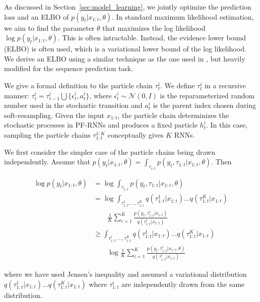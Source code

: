 \documentclass[letterpaper]{article} %
\begin{document}
As discussed in Section~\ref{sec:model_learning}, we jointly optimize the prediction loss and an ELBO of $p(y_t|x_{1:t},\theta)$. In standard maximum likelihood estimation, we aim to find the parameter $\theta$ that maximizes the log likelihood $\log p(y_t|x_{1:t},\theta)$. This is often intractable. Instead, the evidence lower bound (ELBO) is often used, which is a variational lower bound of the log likelihood. We derive an ELBO using a similar technique as the one used in \cite{burda2015importance}, but heavily modified for the sequence prediction task.

We give a formal definition to the particle chain $\tau_t^i$. We define $\tau_t^i$ in a recursive manner: $\tau_t^i = \tau_{t-1}^i \bigcup \{\epsilon_t^i, a_t^i\}$, where $\epsilon_t^i\sim \mathcal{N}(0, I)$ is the reparameterized random number used in the stochastic transition and $a_t^i$ is the parent index chosen during soft-resampling. Given the input $x_{1:t}$, the particle chain determinizes the stochastic processes in PF-RNNs and produces a fixed particle $h_t^i$. In this case, sampling the particle chains $\tau_{1:t}^{1:K}$ conceptually gives $K$ RNNs.

We first consider the simpler case of the particle chains being drawn independently. Assume that $p(y_t|x_{1:t},\theta)=\int_{\tau_{1:t}}p(y_t,\tau_{1:t}|x_{1:t},\theta)$. Then

\begin{align*}
	\log p(y_t|x_{1:t},\theta) &= \log \int_{\tau_{1:t}} p(y_t,\tau_{1:t}|x_{1:t},\theta)\\
&= \log \int_{\tau_{1:t}^1,\ldots,\tau_{1:t}^K}q(\tau_{1:t}^1|x_{1:t})\ldots q(\tau_{1:t}^K|x_{1:t})\\
&\qquad\frac{1}{K}\sum_{i=1}^K  \frac{p(y_t,\tau_{1:t}^i|x_{1:t})}{q(\tau_{1:t}^i|x_{1:t})}\\
&\geq \int_{\tau_{1:t}^i,\ldots,\tau_{1:t}^K}q(\tau_{1:t}^1|x_{1:t})\ldots q(\tau_{1:t}^K|x_{1:t})\\
&\qquad\log \frac{1}{K}\sum_{i=1}^K  \frac{p(y_t,\tau_{1:t}^i|x_{1:t},\theta)}{q(\tau_{1:t}^i|x_{1:t})}
\end{align*}

where we have used Jensen's inequality and assumed a variational distribution $q(\tau_{1:t}^1|x_{1:t})\ldots q(\tau_{1:t}^K|x_{1:t})$ where $\tau_{1:t}^i$ are independently drawn from the same distribution.
\end{document}
